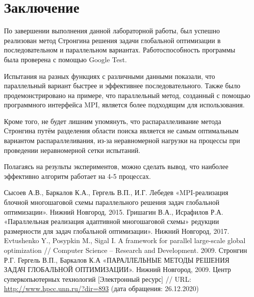 \documentclass{report}
\begin{document}
\section*{Заключение}
По завершении выполнения данной лабораторной работы, был успешно реализован метод Стронгина решения задачи глобальной оптимизации в последовательном и параллельном вариантах. Работоспособность программы была проверена с помощью Google Test.
\par Испытания на разных функциях с различными данными показали, что параллельный вариант быстрее и эффективнее последовательного. Также было продемонстрировано на примере, что параллельный метод, созданный с помощью программного интерфейса MPI, является более подходящим для использования.
\par Кроме того, не будет лишним упомянуть, что распараллеливание метода Стронгина путём разделения области поиска является не самым оптимальным вариантом распараллеливания, из-за неравномерной нагрузки на процессы при проведении неравномерной сетки испытаний.
\par Полагаясь на результы экспериментов, можно сделать вывод, что наиболее эффективно алгоритм работает на 4-5 процессах.
\newpage

\begin{thebibliography}{1}
 Сысоев А.В., Баркалов К.А., Гергель В.П.,  И.Г. Лебедев «MPI-реализация блочной многошаговой схемы параллельного решения задач глобальной оптимизации». Нижний Новгород, 2015. 
 Гришагин В.А., Исрафилов Р.А. «Параллельная реализация адаптивной многошаговой схемы»
редукции размерности для задач глобальной оптимизации». Нижний Новгород, 2017.
Evtushenko Y., Posypkin M., Sigal I. A framework for parallel large-scale global optimization // Computer Science – Research and Development. 2009.
 Стронгин Р.Г. Гергель В.П., Баркалов К.А «ПАРАЛЛЕЛЬНЫЕ МЕТОДЫ РЕШЕНИЯ ЗАДАЧ
ГЛОБАЛЬНОЙ ОПТИМИЗАЦИИ». Нижний Новгород, 2009.
 Центр суперкопьютерных технологий [Электронный ресурс] // URL: \url {http://www.hpcc.unn.ru/?dir=893} (дата обращения: 26.12.2020)
\end{thebibliography}
\newpage

\end{document}
